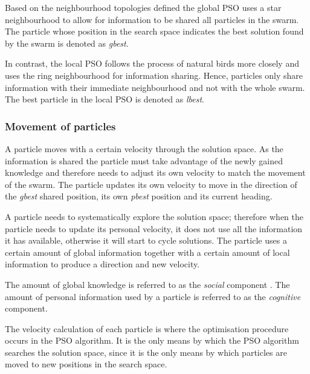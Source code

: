 Based on the neighbourhood topologies defined the global \gls{PSO} uses a star neighbourhood to allow for information to be shared all particles in the swarm. The particle whose position in the search space indicates the best solution found by the swarm is denoted as \emph{gbest}\cite{SOSwarm, FundamentalSwarm, CompuIntelligenceIntro}. 

In contrast, the local \gls{PSO} follows the process of natural birds more closely and uses the ring neighbourhood for information sharing\cite{SOSwarm, FundamentalSwarm, CompuIntelligenceIntro}. Hence, particles only share information with their immediate neighbourhood and not with the whole swarm. The best particle in the local \gls{PSO} is denoted as \emph{lbest}\cite{SOSwarm, FundamentalSwarm, CompuIntelligenceIntro}.

\subsubsection{Movement of particles}
\label{sec:particleVelocity}
A particle moves with a certain velocity through the solution space. As the information is shared the particle must take advantage of the newly gained knowledge and therefore needs to adjust its own velocity to match the movement of the swarm. The particle updates its own velocity to move in the direction of the \emph{gbest} shared position, its own \emph{pbest} position and its current heading.

A particle needs to systematically explore the solution space; therefore when the particle needs to update its personal velocity, it does not use all the information it has available, otherwise it will start to cycle solutions. The particle uses a certain amount of global information together with a certain amount of local information to produce a direction and new velocity\cite{FundamentalSwarm,CompuIntelligenceIntro,PSOSelfHierarch,SOSwarm}. 

The amount of global knowledge is referred to as the \emph{social} \label{def:socialcomponent} component \cite{FundamentalSwarm,CompuIntelligenceIntro,PSOSelfHierarch,SOSwarm}. The amount of personal information used by a particle is referred to as the \emph{cognitive} \label{def:cognitivecomponent} component\cite{FundamentalSwarm,CompuIntelligenceIntro,PSOSelfHierarch,SOSwarm}.

The velocity calculation of each particle is where the optimisation procedure occurs in the \gls{PSO} algorithm. It is the only means by which the \gls{PSO} algorithm searches the solution space, since it is the only means by which particles are moved to new positions in the search space\cite{CompuIntelligenceIntro}.

